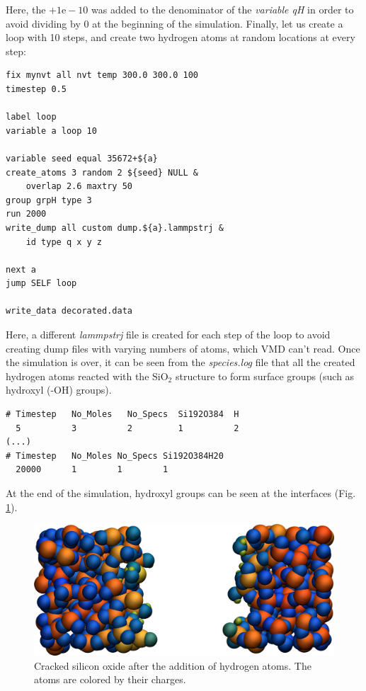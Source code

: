 \documentclass[9pt,tutorial]{livecoms}
\begin{document}
Here, the $+1\text{e}-10$ was added to the denominator of the \textit{variable qH} in order to avoid dividing by 0 at the beginning of the simulation. Finally, let us create a loop with 10 steps, and create two hydrogen atoms at random locations at every step: 
{\normalsize \begin{verbatim}
fix mynvt all nvt temp 300.0 300.0 100
timestep 0.5 

label loop
variable a loop 10

variable seed equal 35672+${a} 
create_atoms 3 random 2 ${seed} NULL &
    overlap 2.6 maxtry 50
group grpH type 3
run 2000
write_dump all custom dump.${a}.lammpstrj &
    id type q x y z

next a
jump SELF loop

write_data decorated.data
\end{verbatim}}
Here, a different \textit{lammpstrj} file is created for each step of the loop to avoid creating dump files with varying numbers of atoms, which VMD can't read. Once the simulation is over, it can be seen from the \textit{species.log} file that
all the created hydrogen atoms reacted with the $\text{SiO}_{2}$ structure to form surface groups (such as hydroxyl (-OH) groups).
{\normalsize \begin{verbatim}
# Timestep   No_Moles   No_Specs  Si192O384  H
  5          3          2         1          2
(...)
# Timestep   No_Moles No_Specs Si192O384H20
  20000      1        1        1
\end{verbatim}}
At the end of  the simulation, hydroxyl groups can be seen at the interfaces (Fig.\,\ref{fig:SIO-decorated}).

\begin{figure}
\includegraphics[width=\linewidth]{SIO-decorated}
\caption{Cracked silicon oxide after the addition of hydrogen atoms. The atoms are colored by their charges.}
\label{fig:SIO-decorated}
\end{figure}
\end{document}
